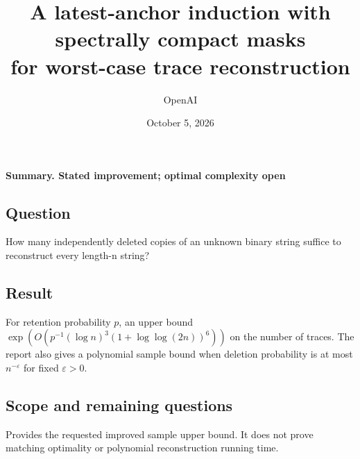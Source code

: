 \documentclass[
  11pt,
]{article}
\title{A latest-anchor induction with spectrally compact masks\\for worst-case trace reconstruction}
\author{OpenAI}
\date{October 5, 2026}
\begin{document}
\hypertarget{trace-reconstruction-sample-upper-bound}{%
\maketitle\label{trace-reconstruction-sample-upper-bound}}

\textbf{Summary. Stated improvement; optimal complexity open}

\hypertarget{question}{%
\subsection{Question}\label{question}}

How many independently deleted copies of an unknown binary string suffice to reconstruct every length-n string?

\hypertarget{result}{%
\subsection{Result}\label{result}}

For retention probability \(p\), an upper bound \(\exp(O(p^{-1}(\log n)^3(1+\log\log(2n))^6))\) on the number of traces. The report also gives a polynomial sample bound when deletion probability is at most \(n^{-\varepsilon}\) for fixed \(\varepsilon>0\).

\hypertarget{scope-and-remaining-questions}{%
\subsection{Scope and remaining questions}\label{scope-and-remaining-questions}}

Provides the requested improved sample upper bound. It does not prove matching optimality or polynomial reconstruction running time.
\end{document}
